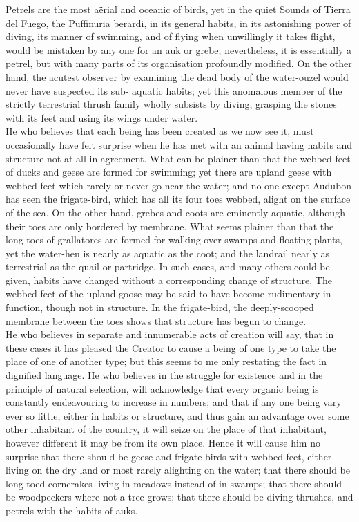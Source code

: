 \indent Petrels are the most a\"{e}rial and oceanic of birds, yet in the quiet Sounds of Tierra del Fuego, the Puffinuria berardi, in its general habits, in its astonishing power of diving, its manner of swimming, and of flying when unwillingly it takes flight, would be mistaken by any one for an auk or grebe; nevertheless, it is essentially a petrel, but with many parts of its organisation profoundly modified. On the other hand, the acutest observer by examining the dead body of the water-ouzel would never have suspected its sub- aquatic habits; yet this anomalous member of the strictly terrestrial thrush family wholly subsists by diving, grasping the stones with its feet and using its wings under water.\\
\indent He who believes that each being has been created as we now see it, must occasionally have felt surprise when he has met with an animal having habits and structure not at all in agreement. What can be plainer than that the webbed feet of ducks and geese are formed for swimming; yet there are upland geese with webbed feet which rarely or never go near the water; and no one except Audubon has seen the frigate-bird, which has all its four toes webbed, alight on the surface of the sea. On the other hand, grebes and coots are eminently aquatic, although their toes are only bordered by membrane. What seems plainer than that the long toes of grallatores are formed for walking over swamps and floating plants, yet the water-hen is nearly as aquatic as the coot; and the landrail nearly as terrestrial as the quail or partridge. In such cases, and many others could be given, habits have changed without a corresponding change of structure. The webbed feet of the upland goose may be said to have become rudimentary in function, though not in structure. In the frigate-bird, the deeply-scooped membrane between the toes shows that structure has begun to change.\\
\indent He who believes in separate and innumerable acts of creation will say, that in these cases it has pleased the Creator to cause a being of one type to take the place of one of another type; but this seems to me only restating the fact in dignified language. He who believes in the struggle for existence and in the principle of natural selection, will acknowledge that every organic being is constantly endeavouring to increase in numbers; and that if any one being vary ever so little, either in habits or structure, and thus gain an advantage over some other inhabitant of the country, it will seize on the place of that inhabitant, however different it may be from its own place. Hence it will cause him no surprise that there should be geese and frigate-birds with webbed feet, either living on the dry land or most rarely alighting on the water; that there should be long-toed corncrakes living in meadows instead of in swamps; that there should be woodpeckers where not a tree grows; that there should be diving thrushes, and petrels with the habits of auks.\\

